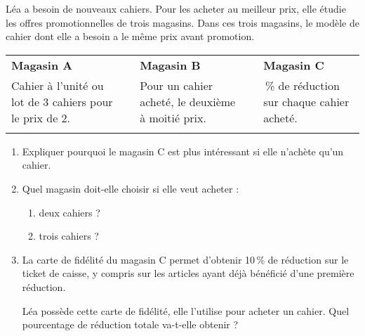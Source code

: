 
\medskip

Léa a besoin de nouveaux cahiers. Pour les acheter au meilleur prix, elle étudie les offres promotionnelles de trois magasins. Dans ces trois magasins, le modèle de cahier dont elle a besoin a le même prix avant promotion. 

\begin{center}
\begin{tabularx}{\linewidth}{|>{\centering\arraybackslash}X|m{0.1cm}|>{\centering\arraybackslash}X|m{0.1cm}|>{\centering\arraybackslash}X|}\cline{1-1}\cline{3-3}\cline{5-5}
\textbf{Magasin A} &&\textbf{Magasin B} 
&&\textbf{Magasin C}\\ 
Cahier à l'unité ou lot de 3 cahiers pour le prix de 2. &&Pour un cahier acheté, le deuxième à moitié prix.&&30\,\% de réduction sur chaque cahier acheté.\\  \cline{1-1}\cline{3-3}\cline{5-5}
\end{tabularx}
\end{center}

\begin{enumerate}
\item Expliquer pourquoi le magasin C est plus intéressant si elle n'achète qu'un cahier. 
\item Quel magasin doit-elle choisir si elle veut acheter : 
\begin{enumerate}
\item deux cahiers ? 
\item trois cahiers ? 
\end{enumerate}
\item La carte de fidélité du magasin C permet d'obtenir 10\,\% de réduction sur le ticket de caisse, y compris sur les articles ayant déjà bénéficié d'une première réduction. 

Léa possède cette carte de fidélité, elle l'utilise pour acheter un cahier. Quel pourcentage de réduction totale va-t-elle obtenir ? 
\end{enumerate}

\vspace{0,5cm} 

